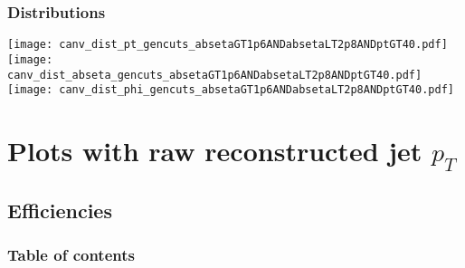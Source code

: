 \documentclass[8pt]{beamer}
\begin{document}
\begin{frame}
 \frametitle{Distributions}
 
 \texttt{[image: canv\_dist\_pt\_gencuts\_absetaGT1p6ANDabsetaLT2p8ANDptGT40.pdf]}
 \texttt{[image: canv\_dist\_abseta\_gencuts\_absetaGT1p6ANDabsetaLT2p8ANDptGT40.pdf]}
 \texttt{[image: canv\_dist\_phi\_gencuts\_absetaGT1p6ANDabsetaLT2p8ANDptGT40.pdf]}
\end{frame}

\section{Plots with raw reconstructed jet $p_{T}$}

\subsection{Efficiencies}

\begin{frame}
 \frametitle{Table of contents}
 
\end{frame}
\end{document}
